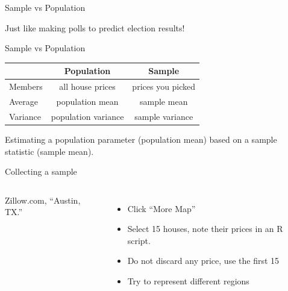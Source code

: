 \documentclass{beamer}\usepackage[]{graphicx}\usepackage[]{color}
\begin{document}
\begin{darkframes}
\begin{frame}[label=lists]{Sample vs Population}
   		
		Just like making polls to predict election results!
		
    \end{frame}    



    \begin{frame}[label=lists]{Sample vs Population}
    	
		
   		
		\begin{table}[!b]
        {\carlitoTLF %
        \begin{tabularx}{\textwidth}{Xcc}
          \textbf{} & \textbf{Population} & \textbf{Sample} \\
          \toprule
          Members       		& all house prices  & prices you picked  \\
          Average               & population mean   & sample mean  \\
          Variance          & population variance   & sample variance \\
          \bottomrule
        \end{tabularx}}
        
      \end{table} 
      \quad \newline    		
   		
   		Estimating a \alert{population parameter} (population mean) based on a \alert{sample statistic} (sample mean).
		
		
    \end{frame}  
 

    \begin{frame}[label=lists]{Collecting a sample}
    
    \begin{columns}[onlytextwidth]
        	Zillow.com, ``Austin, TX.'' 
        	\begin{itemize}
   				\item Click ``More Map''
   				\item Select 15 houses, note their prices in an R script. 
   				\item Do not discard any price, use the first 15
   				\item Try to represent different regions
			\end{itemize}
        

\end{columns}
\end{frame}
\end{darkframes}
\end{document}
